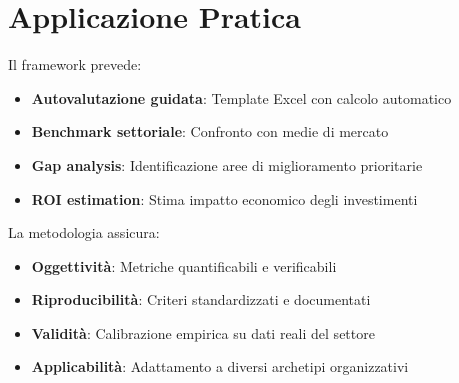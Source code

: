 \section{\texorpdfstring{Applicazione Pratica}{B.7 - Applicazione Pratica}}

Il framework prevede:

\begin{itemize}
    \item \textbf{Autovalutazione guidata}: Template Excel con calcolo automatico
    \item \textbf{Benchmark settoriale}: Confronto con medie di mercato
    \item \textbf{Gap analysis}: Identificazione aree di miglioramento prioritarie
    \item \textbf{ROI estimation}: Stima impatto economico degli investimenti
\end{itemize}

La metodologia assicura:
\begin{itemize}
    \item \textbf{Oggettività}: Metriche quantificabili e verificabili
    \item \textbf{Riproducibilità}: Criteri standardizzati e documentati
    \item \textbf{Validità}: Calibrazione empirica su dati reali del settore
    \item \textbf{Applicabilità}: Adattamento a diversi archetipi organizzativi
\end{itemize}
